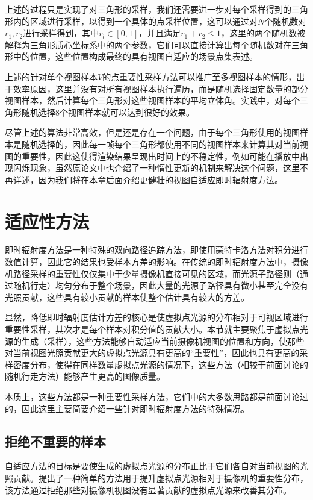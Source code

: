 上述的过程只是实现了对三角形的采样，我们还需要进一步对每个采样得到的三角形内的区域进行采样，以得到一个具体的点采样位置，这可以通过对$N$个随机数对$r_1,r_2$进行采样得到，其中$r_l\in[0,1]$，并且满足$r_1+r_2\leq 1$，这里的两个随机数被解释为三角形质心坐标系中的两个参数，它们可以直接计算出每个随机数对在三角形中的位置，这些位置构成最终的具有视图自适应的场景点集表述。

上述的针对单个视图样本$V$的点重要性采样方法可以推广至多视图样本的情形，出于效率原因，这里并没有对所有视图样本执行遍历，而是随机选择固定数量的部分视图样本，然后计算每个三角形对这些视图样本的平均立体角。实践中，对每个三角形随机选择8个视图样本就可以达到很好的效果。

尽管上述的算法非常高效，但是还是存在一个问题，由于每个三角形使用的视图样本是随机选择的，因此每一帧每个三角形都使用不同的视图样本来计算其对当前视图的重要性，因此这使得渲染结果呈现出时间上的不稳定性，例如可能在播放中出现闪烁现象，虽然原论文中也介绍了一种惰性更新的机制来解决这个问题，这里不再详述，因为我们将在本章后面介绍更健壮的视图自适应即时辐射度方法。




\section{适应性方法}
即时辐射度方法是一种特殊的双向路径追踪方法，即使用蒙特卡洛方法对积分进行数值计算，因此它的结果也受样本方差的影响。在传统的即时辐射度方法中，摄像机路径采样的重要性仅仅集中于少量摄像机直接可见的区域，而光源子路径则（通过随机行走）均匀分布于整个场景，因此大量的光源子路径具有微小甚至完全没有光照贡献，这些具有较小贡献的样本使整个估计具有较大的方差。

显然，降低即时辐射度估计方差的核心是使虚拟点光源的分布相对于可视区域进行重要性采样，其次才是每个样本对积分值的贡献大小。本节就主要聚焦于虚拟点光源的生成（采样），这些方法能够自动适应当前摄像机视图的位置和方向，使那些对当前视图光照贡献更大的虚拟点光源具有更高的“重要性”，因此也具有更高的采样密度分布，使得在同样数量虚拟点光源的情况下，这些方法（相较于前面讨论的随机行走方法）能够产生更高的图像质量。

本质上，这些方法都是一种重要性采样方法，它们中的大多数思路都是前面讨论过的，因此这里主要简要介绍一些针对即时辐射度方法的特殊情况。




\subsection{拒绝不重要的样本}
自适应方法的目标是要使生成的虚拟点光源的分布正比于它们各自对当前视图的光照贡献。\cite{a:SimpleandRobustIterativeImportanceSamplingofVirtualPointLights}提出了一种简单的方法用于提升虚拟点光源相对于摄像机的重要性分布，该方法通过拒绝那些对摄像机视图没有显著贡献的虚拟点光源来改善其分布。

